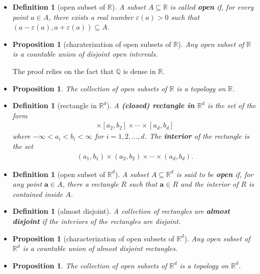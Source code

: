 \documentclass[10pt]{article}
\newtheorem{definition}[lemma]{Definition}
\newtheorem{proposition}[lemma]{Proposition}
\numberwithin{lemma}{section}
\newcommand{\ve}[1]{\mathbf{#1}}
\newcommand{\Real}{\mathbb{R}}
\begin{document}
\begin{itemize}
  \item \begin{definition}[open subset of $\Real$]
    A subset $A \subseteq \Real$ is called {\bf open} if, for every point $a \in A$, there exists a real number $\varepsilon(a) > 0$ such that $(a-\varepsilon(a), a+\varepsilon(a)) \subseteq A$.
  \end{definition}

  \item \begin{proposition}[charaterization of open subsets of $\Real$]
    Any open subset of $\Real$ is a countable union of disjoint open intervals.
  \end{proposition}
  The proof relies on the fact that $\mathbb{Q}$ is dense in $\Real$. 

  \item \begin{proposition}
    The collection of open subsets of $\Real$ is a topology on $\Real$.
  \end{proposition}

  \item \begin{definition}[rectangle in $\Real^d$]
    A {\bf (closed) rectangle in $\Real^d$} is the set of the form
    \begin{align*}
      [a_1, b_1] \times [a_2, b_2] \times \dotsb \times [a_d, b_d]
    \end{align*}
    where $-\infty < a_i < b_i < \infty$ for $i = 1, 2, \dotsc, d$. 
    The {\bf interior} of the rectangle is the set
    \begin{align*}
      (a_1, b_1) \times (a_2, b_2) \times \dotsb \times (a_d, b_d).
    \end{align*}
  \end{definition}

  \item \begin{definition}[open subset of $\Real^d$]
    A subset $A \subseteq \Real^d$ is said to be {\bf open} if, for any point $\ve{a} \in A$, there a rectangle $R$ such that $\ve{a} \in R$ and the interior of $R$ is contained inside $A$.
  \end{definition}

  \item \begin{definition}[almost disjoint]
    A collection of rectangles are {\bf almost disjoint} if the interiors of the rectangles are disjoint.
  \end{definition}

  \item \begin{proposition}[characterization of open subsets of $\Real^d$]
    Any open subset of $\Real^d$ is a countable union of almost disjoint rectangles.
  \end{proposition}

  \item \begin{proposition}
    The collection of open subsets of $\Real^d$ is a topology on $\Real^d$.
  \end{proposition}
\end{itemize}
\end{document}
